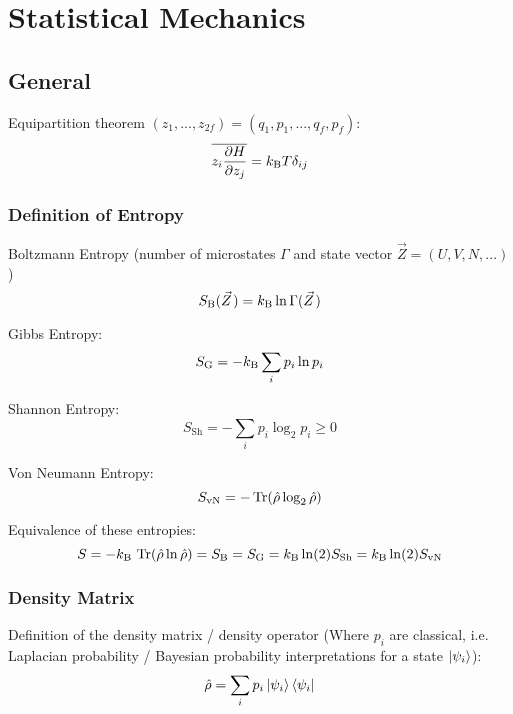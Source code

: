 \section{Statistical Mechanics}
	\subsection{General}
		\noindent
		Equipartition theorem $(z_1,...,z_{2f}) = (q_1, p_1, ..., q_f, p_f)$:
		\begin{equation}
			\overline{ z_i \pdv{H}{z_j}} = k_{\text{B}} T \delta_{ij}
		\end{equation}

		\subsubsection{Definition of Entropy}
			\noindent
			Boltzmann Entropy (number of microstates $\Gamma$ and state vector $\vec{Z}=(U,V,N,...)$)
			\begin{equation}
				S_\text{B}(\vec{Z}) = \kB \ln\Gamma(\vec{Z})
			\end{equation}

			\noindent
			Gibbs Entropy:
			\begin{equation}
				S_\text{G} = -k_{\text{B}} \sum_i p_i \ln p_i
			\end{equation}

			\noindent
			Shannon Entropy:
			\begin{equation}
				S_\text{Sh} = -\sum_i p_i\log_2{p_i} \ge 0
			\end{equation}

			\noindent
			Von Neumann Entropy:
			\begin{equation}
				S_\text{vN} = -\Tr(\hat{\rho}\log_2\hat{\rho})
			\end{equation}

			\noindent
			Equivalence of these entropies:
			\begin{equation}
				S = -k_{\text{B}}\,\Tr(\hat{\rho} \ln \hat{\rho}) = S_\text{B} = S_\text{G} = k_{\text{B}}\ln(2) S_\text{Sh} = k_{\text{B}}\ln(2) S_\text{vN}
			\end{equation}

		\subsubsection{Density Matrix}
			\noindent
			Definition of the density matrix / density operator (Where $p_i$ are classical, i.e. Laplacian probability / Bayesian probability interpretations for a state $\Ket{\psi_i}$):
			\begin{equation}
				\hat{\rho} = \sum_i p_i \Ket{\psi_i}\Bra{\psi_i}
			\end{equation}

